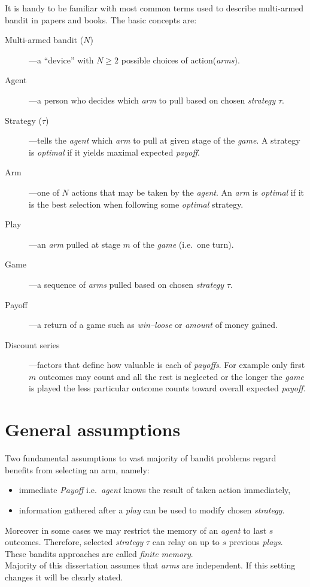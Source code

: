 \documentclass[12pt, a4paper, pdflatex, leqno]{report}
\begin{document}
It is handy to be familiar with most common terms used to describe multi-armed bandit in papers and books. The basic concepts are:
\begin{description}
\item[Multi-armed bandit ($N$)]---a ``device'' with $N \geq 2$ possible choices of action(\emph{arms}).
\item[Agent]---a person who decides which \emph{arm} to pull based on chosen \emph{strategy} $\tau$.
\item[Strategy ($\tau$)]---tells the \emph{agent} which \emph{arm} to pull at given stage of the \emph{game}. A strategy is \emph{optimal} if it yields maximal expected \emph{payoff}.
\item[Arm]---one of $N$ actions that may be taken by the \emph{agent}. An \emph{arm} is \emph{optimal} if it is the best selection when following some \emph{optimal} strategy.
\item[Play]---an \emph{arm} pulled at stage $m$ of the \emph{game} (i.e.\ one turn).
\item[Game]---a sequence of \emph{arms} pulled based on chosen \emph{strategy} $\tau$.
\item[Payoff]---a return of a game such as \emph{win--loose} or \emph{amount} of money gained.
\item[Discount series]---factors that define how valuable is each of \emph{payoffs}. For example only first $m$ outcomes may count and all the rest is neglected or the longer the \emph{game} is played the less particular outcome counts toward overall expected \emph{payoff}.
\end{description}


\section{General assumptions}
Two fundamental assumptions to vast majority of bandit problems regard benefits from selecting an arm, namely:
\begin{itemize}
\item immediate \emph{Payoff} i.e.\ \emph{agent} knows the result of taken action immediately,
\item information gathered after a \emph{play} can be used to modify chosen \emph{strategy}.
\end{itemize}
Moreover in some cases we may restrict the memory of an \emph{agent} to last $s$ outcomes. Therefore, selected \emph{strategy} $\tau$ can relay on up to $s$ previous \emph{plays}. These bandits approaches are called \emph{finite memory}.\\
Majority of this dissertation assumes that \emph{arms} are independent. If this setting changes it will be clearly stated.
\end{document}
